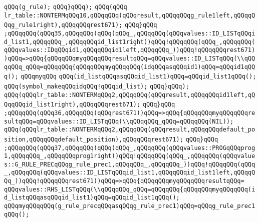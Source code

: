 \verb|qQQq(g_rule);|\newline
\verb|qQQq}qQQq);|\newline
\verb|qQQq(qQQq|\newline
\verb|lr_table::NONTERMqQQq10,qQQqqQQq(qQQqresult,qQQqqQQqg_rule1left,qQQqqQQqg_rule1right),qQQqqQQqrest671);|\newline
\verb|qQQq}qQQq|\newline
\verb|;qQQqqQQq(qQQq35,qQQqqQQq(qQQq(qQQq_,qQQqqQQq(qQQqvalues::ID_LISTqQQqid_list1,qQQqqQQq_,qQQqqQQqid_list1right))qQQq!qQQqqQQq(qQQq_,qQQqqQQq(qQQqvalues::IDqQQqid1,qQQqqQQqid1left,qQQqqQQq_))qQQq!qQQqqQQqrest671))qQQq=>qQQq{qQQqqQQqmyqQQqqQQqresultqQQq=qQQqvalues::ID_LISTqQQq(\\qQQqqQQq_qQQq=qQQqqQQq{qQQqqQQqmyqQQqqQQq(idqQQqasqQQqid1)qQQq=qQQqid1qQQq();|\newline
\verb|qQQqmyqQQq|\newline
\verb|qQQq(id_listqQQqasqQQqid_list1)qQQq=qQQqid_list1qQQq();|\newline
\verb|qQQq(symbol_makeqQQqidqQQq!qQQqid_list);|\newline
\verb|qQQq}qQQq);|\newline
\verb|qQQq(qQQqlr_table::NONTERMqQQq2,qQQqqQQq(qQQqresult,qQQqqQQqid1left,qQQqqQQqid_list1right),qQQqqQQqrest671);|\newline
\verb|qQQq}qQQq|\newline
\verb|;qQQqqQQq(qQQq36,qQQqqQQq(qQQqrest671))qQQq=>qQQq{qQQqqQQqmyqQQqqQQqresultqQQq=qQQqvalues::ID_LISTqQQq(\\qQQqqQQq_qQQq=qQQqqQQq(NIL));|\newline
\verb|qQQq(qQQqlr_table::NONTERMqQQq2,qQQqqQQq(qQQqresult,qQQqqQQqdefault_position,qQQqqQQqdefault_position),qQQqqQQqrest671);|\newline
\verb|qQQq}qQQq|\newline
\verb|;qQQqqQQq(qQQq37,qQQqqQQq(qQQq(qQQq_,qQQqqQQq(qQQqvalues::PROGqQQqprog1,qQQqqQQq_,qQQqqQQqprog1right))qQQq!qQQqqQQq(qQQq_,qQQqqQQq(qQQqvalues::G_RULE_PRECqQQqg_rule_prec1,qQQqqQQq_,qQQqqQQq_))qQQq!qQQqqQQq(qQQq_,qQQqqQQq(qQQqvalues::ID_LISTqQQqid_list1,qQQqqQQqid_list1left,qQQqqQQq_))qQQq!qQQqqQQqrest671))qQQq=>qQQq{qQQqqQQqmyqQQqqQQqresultqQQq=|\newline
\verb|qQQqvalues::RHS_LISTqQQq(\\qQQqqQQq_qQQq=qQQqqQQq{qQQqqQQqmyqQQqqQQq(id_listqQQqasqQQqid_list1)qQQq=qQQqid_list1qQQq();|\newline
\verb|qQQqmyqQQqqQQq(g_rule_precqQQqasqQQqg_rule_prec1)qQQq=qQQqg_rule_prec1qQQq();|\newline
